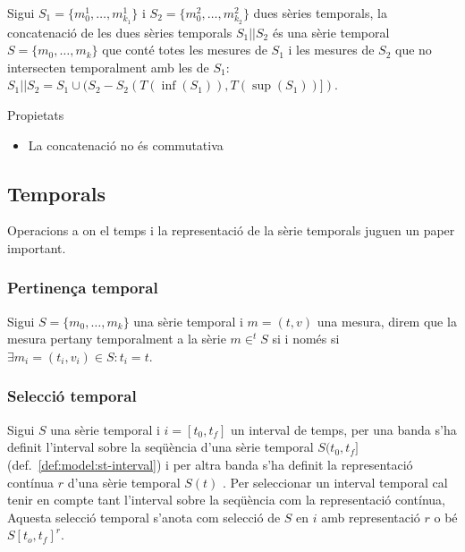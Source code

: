 \begin{definition}[concatenació]
  Sigui $S_1=\{m_0^1, \dotsc, m_{k_1}^1\}$ i $S_2=\{m_0^2, \dotsc,
  m_{k_2}^2\}$ dues sèries temporals, la concatenació de les dues
  sèries temporals $S_1 || S_2$ és una sèrie temporal $S=\{m_0,
  \dotsc, m_k\}$ que conté totes les mesures de $S_1$ i les mesures de
  $S_2$ que no intersecten temporalment amb les de $S_1$: $S_1 ||
  S_2 =  S_1 \cup ( S_2 - S_2(T(\inf(S_1)),T(\sup(S_1))] )$.
\end{definition}

Propietats
\begin{itemize}
\item La concatenació no és commutativa
\end{itemize}




\subsection{Temporals}

Operacions a on el temps i la representació de la sèrie temporals
juguen un paper important.


\subsubsection{Pertinença temporal}

\begin{definition}
  Sigui $S=\{m_0, \dotsc, m_{k}\}$ una sèrie temporal i $m=(t,v)$ una
  mesura, direm que la mesura pertany temporalment a la sèrie 
  $m\in^t S$ si i només si $\exists m_i=(t_i,v_i)\in S: t_i=t$.
\end{definition}





\subsubsection{Selecció temporal}

Sigui $S$ una sèrie temporal i $i=[t_0,t_f]$ un interval de temps,
per una banda s'ha definit l'interval sobre la seqüència d'una sèrie temporal $S(t_0,t_f]$ (def.~\ref{def:model:st-interval})  i per altra banda s'ha definit la representació contínua $r$ d'una sèrie temporal $S(t)$ .
Per seleccionar un interval temporal cal tenir en compte tant l'interval sobre la seqüència com la representació contínua, Aquesta selecció temporal s'anota com selecció de $S$ en $i$ amb representació $r$ o bé $S[t_o,t_f]^r$. 

